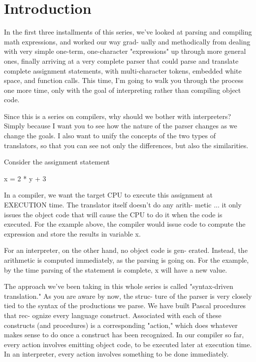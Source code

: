 \documentclass[float=false, crop=false]{standalone}
\begin{document}
\section{Introduction}

In the first three installments of this series, we've looked at parsing and
compiling math expressions, and worked our way grad- ually and methodically from
dealing with very simple one-term, one-character "expressions" up through more
general ones, finally arriving at a very complete parser that could parse and
translate complete assignment statements, with multi-character tokens, embedded
white space, and function calls. This time, I'm going to walk you through the
process one more time, only with the goal of interpreting rather than compiling
object code.

Since this is a series on compilers, why should we bother with interpreters?
Simply because I want you to see how the nature of the parser changes as we
change the goals. I also want to unify the concepts of the two types of
translators, so that you can see not only the differences, but also the
similarities.

Consider the assignment statement

               x = 2 * y + 3

In a compiler, we want the target CPU to execute this assignment at EXECUTION
time. The translator itself doesn't do any arith- metic ... it only issues the
object code that will cause the CPU to do it when the code is executed. For the
example above, the compiler would issue code to compute the expression and store
the results in variable x.

For an interpreter, on the other hand, no object code is gen- erated. Instead,
the arithmetic is computed immediately, as the parsing is going on. For the
example, by the time parsing of the statement is complete, x will have a new
value.

The approach we've been taking in this whole series is called "syntax-driven
translation." As you are aware by now, the struc- ture of the parser is very
closely tied to the syntax of the productions we parse. We have built Pascal
procedures that rec- ognize every language construct. Associated with each of
these constructs (and procedures) is a corresponding "action," which does
whatever makes sense to do once a construct has been recognized. In our compiler
so far, every action involves emitting object code, to be executed later at
execution time. In an interpreter, every action involves something to be done
immediately.
\end{document}
